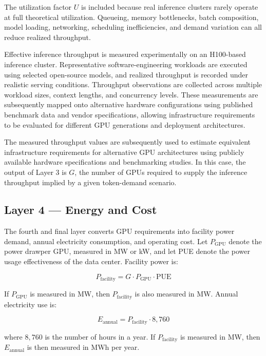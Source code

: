 \documentclass{article}
\begin{document}
The utilization factor $U$ is included because real inference clusters rarely operate at full theoretical utilization. Queueing, memory bottlenecks, batch composition, model loading, networking, scheduling inefficiencies, and demand variation can all reduce realized throughput.

Effective inference throughput is measured experimentally on an H100-based inference cluster. Representative software-engineering workloads are executed using selected open-source models, and realized throughput is recorded under realistic serving conditions. Throughput observations are collected across multiple workload sizes, context lengths, and concurrency levels. These measurements are subsequently mapped onto alternative hardware configurations using published benchmark data and vendor specifications, allowing infrastructure requirements to be evaluated for different GPU generations and deployment architectures.

The measured throughput values are subsequently used to estimate equivalent infrastructure requirements for alternative GPU architectures using publicly available hardware specifications and benchmarking studies. In this case, the output of Layer 3 is $G$, the number of GPUs required to supply the inference throughput implied by a given token-demand scenario.

\subsection{Layer 4 --- Energy and Cost}

The fourth and final layer converts GPU requirements into facility power demand, annual electricity consumption, and operating cost. Let $P_{\mathrm{GPU}}$ denote the power drawper GPU, measured in MW or kW, and let PUE denote the power usage effectiveness of the data center. Facility power is:

\begin{equation}
P_{\mathrm{facility}} = G \cdot P_{\mathrm{GPU}} \cdot \mathrm{PUE}
\label{eq6}
\end{equation}

If $P_{\mathrm{GPU}}$ is measured in MW, then $P_{\mathrm{facility}}$ is also measured in MW. Annual electricity use is:

\begin{equation}
E_{\mathrm{annual}} = P_{\mathrm{facility}} \cdot 8{,}760
\label{eq7}
\end{equation}

where $8{,}760$ is the number of hours in a year. If $P_{\mathrm{facility}}$ is measured in MW, then $E_{\mathrm{annual}}$ is then measured in MWh per year.
\end{document}
